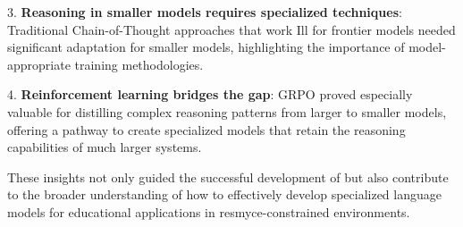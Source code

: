 3. \textbf{Reasoning in smaller models requires specialized techniques}: Traditional Chain-of-Thought approaches that work Ill for frontier models needed significant adaptation for smaller models, highlighting the importance of model-appropriate training methodologies.

4. \textbf{Reinforcement learning bridges the gap}: GRPO proved especially valuable for distilling complex reasoning patterns from larger to smaller models, offering a pathway to create specialized models that retain the reasoning capabilities of much larger systems.

These insights not only guided the successful development of \linksys but also contribute to the broader understanding of how to effectively develop specialized language models for educational applications in resmyce-constrained environments.
